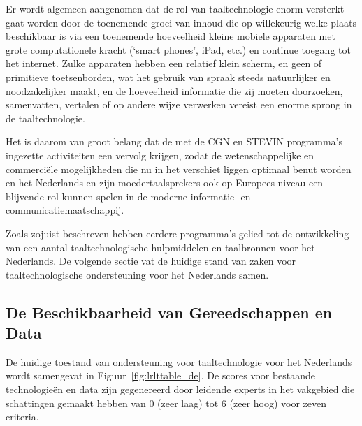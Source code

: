 \documentclass[]{../../metanetpaper}
\begin{document}
\begin{multicols}{2}
  Er wordt algemeen aangenomen dat de rol van taaltechnologie enorm versterkt gaat worden door de toenemende groei van inhoud die op willekeurig welke plaats beschikbaar is via een toenemende hoeveelheid kleine mobiele apparaten met grote computationele kracht (`smart phones', iPad, etc.) en continue toegang tot het internet. Zulke apparaten hebben een relatief klein scherm, en geen of primitieve toetsenborden, wat het gebruik van spraak steeds natuurlijker en noodzakelijker maakt, en de hoeveelheid informatie die zij moeten doorzoeken, samenvatten, vertalen of op andere wijze verwerken vereist een enorme sprong in de taaltechnologie.

  Het is daarom van groot belang dat de met de CGN en STEVIN programma's ingezette activiteiten een vervolg krijgen, zodat de wetenschappelijke en commerci{\"e}le mogelijkheden die nu in het verschiet liggen optimaal benut worden en het Nederlands en zijn moedertaalsprekers ook op Europees niveau een blijvende rol kunnen spelen in de moderne informatie- en communicatiemaatschappij.

Zoals zojuist beschreven hebben eerdere programma's gelied tot de ontwikkeling van een aantal taaltechnologische hulpmiddelen en taalbronnen voor het Nederlands. De volgende sectie vat de huidige stand van zaken voor taaltechnologische ondersteuning voor het Nederlands samen.

\subsection{De Beschikbaarheid van Gereedschappen en Data}

    De huidige toestand van ondersteuning voor taaltechnologie voor het Nederlands wordt samengevat in Figuur~\ref{fig:lrlttable_de}. De scores voor bestaande technologie\"{e}n en data zijn gegenereerd door leidende experts in het vakgebied die schattingen gemaakt hebben van 0 (zeer laag) tot 6 (zeer hoog) voor zeven criteria.



\end{multicols}
\end{document}
